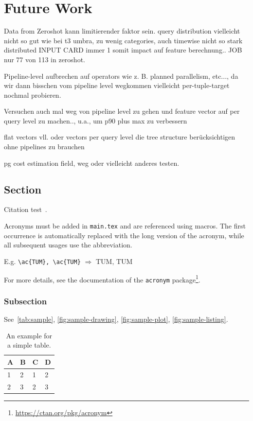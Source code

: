 
\chapter{Future Work}\label{chapter:future_work}

Data from Zeroshot kann limitierender faktor sein. 
query distribution vielleicht nicht so gut wie bei t3 umbra, zu wenig categories, auch timewise nicht so stark distributed
INPUT CARD immer 1 somit impact auf feature berechnung..
JOB nur 77 von 113 in zeroshot.


Pipeline-level aufbrechen auf operators wie z. B. planned parallelism, etc..., da wir dann bisschen vom pipeline level wegkommen vielleicht per-tuple-target nochmal probieren.

Versuchen auch mal weg von pipeline level zu gehen und feature vector auf per query level zu machen.., u.a., um p90 plus max zu verbessern

flat vectors vll. oder vectors per query level die tree structure berücksichtigen ohne pipelines zu brauchen 

pg cost estimation field, weg oder vielleicht anderes testen.
\section{Section}



Citation test~\parencite{latex}.

Acronyms must be added in \texttt{main.tex} and are referenced using macros. The first occurrence is automatically replaced with the long version of the acronym, while all subsequent usages use the abbreviation.

E.g. \texttt{\textbackslash ac\{TUM\}, \textbackslash ac\{TUM\}} $\Rightarrow$ \ac{TUM}, \ac{TUM}

For more details, see the documentation of the \texttt{acronym} package\footnote{\url{https://ctan.org/pkg/acronym}}.
\subsection{Subsection}

See~\autoref{tab:sample}, \autoref{fig:sample-drawing}, \autoref{fig:sample-plot}, \autoref{fig:sample-listing}.

\begin{table}[htpb]
  \caption[Example table]{An example for a simple table.}\label{tab:sample}
  \centering
  \begin{tabular}{l l l l}
    \toprule
      A & B & C & D \\
    \midrule
      1 & 2 & 1 & 2 \\
      2 & 3 & 2 & 3 \\
    \bottomrule
  \end{tabular}
\end{table}

